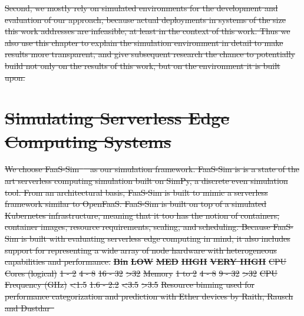 \documentclass[draft,final]{vutinfth} %
\providecommand{\DIFdeltex}[1]{{\protect\color{red}\sout{#1}}}                      %
\providecommand{\DIFdelFL}[1]{\DIFdel{#1}} %
\providecommand{\DIFdel}[1]{\texorpdfstring{\DIFdeltex{#1}}{}} %
\begin{document}
\DIFdel{Second, we mostly rely on simulated environments for the development and evaluation of our approach, because actual deployments in systems of the size this work addresses are infeasible, at least in the context of this work.
Thus we also use this chapter to explain the simulation environment in detail to make results more transparent, and give subsequent research the chance to potentially build not only on the results of this work, but on the environment it is built upon.
}\section{\DIFdel{Simulating Serverless Edge Computing Systems}}
\addtocounter{section}{-1}%
\DIFdel{We choose FaaS-Sim\mbox{%
\cite{faas-sim-github} }\hskip0pt%
as our simulation framework.
FaaS-Sim is is a state of the art serverless computing simulation built on SimPy, %
a discrete even simulation tool.
From an architectural basis, FaaS-Sim is built to mimic a serverless framework similar to OpenFaaS.
FaaS-Sim is built on top of a simulated Kubernetes infrastructure, meaning that it too has the notion of containers, container images, resource requirements, scaling, and scheduling.
Because FaaS-Sim is built with evaluating serverless edge computing in mind, it also includes support for representing a wide array of node hardware with heterogeneous capabilities and performance.
}%
\textbf{\DIFdelFL{Bin}}        %
\textbf{\DIFdelFL{LOW}}  %
\textbf{\DIFdelFL{MED}} %
\textbf{\DIFdelFL{HIGH}} %
\textbf{\DIFdelFL{VERY HIGH}} %
\DIFdelFL{CPU Cores (logical) }%
\DIFdelFL{1 - 2         }%
\DIFdelFL{4 - 8        }%
\DIFdelFL{16 - 32       }%
\DIFdelFL{\textgreater 32    }%
\DIFdelFL{Memory              }%
\DIFdelFL{1 to 2        }%
\DIFdelFL{4 - 8        }%
\DIFdelFL{9 - 32        }%
\DIFdelFL{\textgreater 32    }%
\DIFdelFL{CPU Frequency (GHz) }%
\DIFdelFL{\textless 1.5 }%
\DIFdelFL{1.6 - 2.2    }%
\DIFdelFL{\textless 3.5 }%
\DIFdelFL{\textgreater 3.5   }%
{%
\DIFdelFL{Resource binning used for performance categorization and prediction with Ether devices by Raith, Rausch and Dustdar\mbox{%
\cite{philipp-da}}\hskip0pt%
}}
\end{document}
